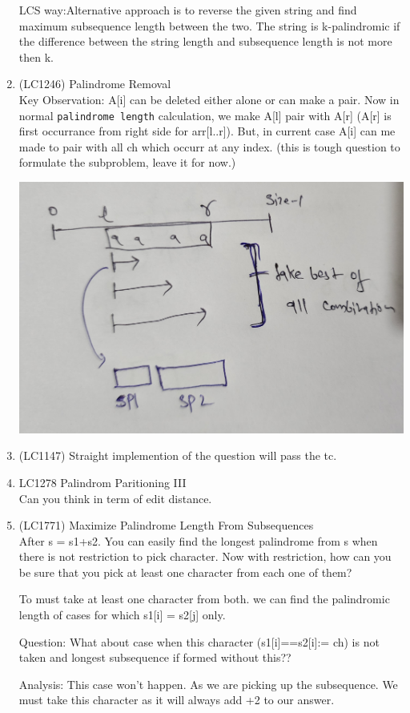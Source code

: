 \begin{exerciseHints}
\begin{enumerate}
        LCS way:Alternative approach is to reverse the given string and find maximum subsequence length between the two. The string is k-palindromic if the difference between the string length and subsequence length is not more then k.
        
        \item (LC1246) Palindrome Removal \\Key Observation: A[i] can be deleted either alone or can make a pair. Now in normal \verb|palindrome length| calculation, we make A[l] pair with A[r] (A[r] is first occurrance from right side for arr[l..r]). But, in current case A[i] can me made to pair with all ch which occurr at any index.
        (this is tough question to formulate the subproblem, leave it for now.)
        
        \includegraphics[width=\marginparwidth]{./resources/LC1246_p1.jpg}

        \item (LC1147) Straight implemention of the question will pass the tc.
        
        \item LC1278 Palindrom Paritioning III \\ Can you think in term of edit distance.
        
        \item (LC1771) Maximize Palindrome Length From Subsequences\\ After s = s1+s2. You can easily find the longest palindrome from s when there is not restriction to pick character.
        Now with restriction, how can you be sure that you pick at least one character from each one of them?

        To must take at least one character from both. we can find the palindromic length of cases for which s1[i] = s2[j] only.

Question: What about case when this character (s1[i]==s2[i]:= ch) is not taken and longest subsequence if formed without this??

Analysis: This case won't happen. As we are picking up the subsequence. We must take this character as it will always add +2 to our answer.

        
    \end{enumerate}
    
\end{exerciseHints}